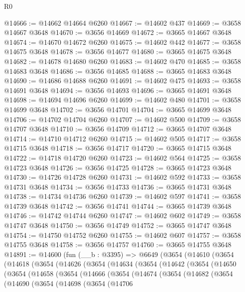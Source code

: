 \begin{lexlean}{R0}
\begin{coremodule}
@14666 := @14662 @14664 @6260
@14667 := @14602 @437
@14669 := @3658 @14667 @3648
@14670 := @3656 @14669
@14672 := @3665 @14667 @3648
@14674 := @14670 @14672 @6260
@14675 := @14602 @442
@14677 := @3658 @14675 @3648
@14678 := @3656 @14677
@14680 := @3665 @14675 @3648
@14682 := @14678 @14680 @6260
@14683 := @14602 @470
@14685 := @3658 @14683 @3648
@14686 := @3656 @14685
@14688 := @3665 @14683 @3648
@14690 := @14686 @14688 @6260
@14691 := @14602 @475
@14693 := @3658 @14691 @3648
@14694 := @3656 @14693
@14696 := @3665 @14691 @3648
@14698 := @14694 @14696 @6260
@14699 := @14602 @480
@14701 := @3658 @14699 @3648
@14702 := @3656 @14701
@14704 := @3665 @14699 @3648
@14706 := @14702 @14704 @6260
@14707 := @14602 @500
@14709 := @3658 @14707 @3648
@14710 := @3656 @14709
@14712 := @3665 @14707 @3648
@14714 := @14710 @14712 @6260
@14715 := @14602 @505
@14717 := @3658 @14715 @3648
@14718 := @3656 @14717
@14720 := @3665 @14715 @3648
@14722 := @14718 @14720 @6260
@14723 := @14602 @564
@14725 := @3658 @14723 @3648
@14726 := @3656 @14725
@14728 := @3665 @14723 @3648
@14730 := @14726 @14728 @6260
@14731 := @14602 @592
@14733 := @3658 @14731 @3648
@14734 := @3656 @14733
@14736 := @3665 @14731 @3648
@14738 := @14734 @14736 @6260
@14739 := @14602 @597
@14741 := @3658 @14739 @3648
@14742 := @3656 @14741
@14744 := @3665 @14739 @3648
@14746 := @14742 @14744 @6260
@14747 := @14602 @602
@14749 := @3658 @14747 @3648
@14750 := @3656 @14749
@14752 := @3665 @14747 @3648
@14754 := @14750 @14752 @6260
@14755 := @14602 @607
@14757 := @3658 @14755 @3648
@14758 := @3656 @14757
@14760 := @3665 @14755 @3648
@14891 := @14600
    (fun (__b : @3395) =>
    @6649
      (@3654
        (@14610
          (@3654
            (@14618
              (@3654
                (@14626
                  (@3654
                    (@14634
                      (@3654
                        (@14642
                          (@3654
                            (@14650
                              (@3654
                                (@14658
                                  (@3654
                                    (@14666
                                      (@3654
                                        (@14674
                                          (@3654
                                            (@14682
                                              (@3654
                                                (@14690
                                                  (@3654
                                                    (@14698
                                                      (@3654
                                                        (@14706

\end{coremodule}
\end{lexlean}
